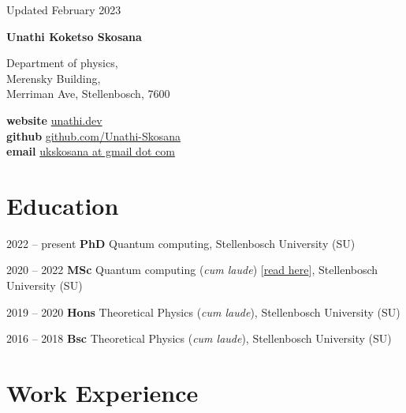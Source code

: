 \documentclass[10pt]{extreport}
\newcommand*{\name}{Unathi Koketso Skosana}
\newcommand{\namefont}[1]{{\normalfont\bfseries\Huge{#1}}}
\begin{document}
\begin{center}
	\vfill
	\small {Updated February 2023}
\end{center}

\vspace{2em}

\namefont{\name}

\vspace{1em}

\begin{minipage}[t]{0.45\linewidth}
	Department of physics, \\
	Merensky Building, \\
	Merriman Ave, Stellenbosch, 7600
\end{minipage}
\hfill
\begin{minipage}[t]{0.5\linewidth}
	\textbf{website} \href{https://www.unathi.dev}{unathi.dev} \\
	\textbf{github}  \href{https://www.github.com/Unathi-Skosana}{github.com/Unathi-Skosana}  \\
	\textbf{email} \href{mailto:ukskosana@gmail.com}{ukskosana at gmail dot com} \hfill
\end{minipage}

\section*{Education}

\begin{tablist}
	\item[2022 -- present]     \tab{}\textbf{PhD} Quantum computing, Stellenbosch University (SU)
	\item[2020 -- 2022] \tab{}\textbf{MSc} Quantum computing (\textit{cum laude}) [\href{https://github.com/Unathi-Skosana/mastersthesis}{read here}], Stellenbosch University (SU)
	\item[2019 -- 2020]  \tab{}\textbf{Hons} Theoretical Physics (\textit{cum laude}), Stellenbosch University (SU)
	\item[2016 -- 2018]  \tab{}\textbf{Bsc} Theoretical Physics (\textit{cum laude}), Stellenbosch University (SU)
\end{tablist}

\section*{Work Experience}
\end{document}
